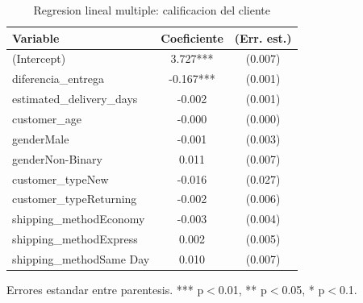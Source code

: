 \begin{table}[htbp]
\centering
\caption{Regresion lineal multiple: calificacion del cliente}
\label{tab:ols}
\begin{tabular}{lcc}
\toprule
Variable & Coeficiente & (Err. est.) \\
\midrule
(Intercept) & 3.727*** & (0.007) \\
diferencia\_entrega & -0.167*** & (0.001) \\
estimated\_delivery\_days & -0.002 & (0.001) \\
customer\_age & -0.000 & (0.000) \\
genderMale & -0.001 & (0.003) \\
genderNon-Binary & 0.011 & (0.007) \\
customer\_typeNew & -0.016 & (0.027) \\
customer\_typeReturning & -0.002 & (0.006) \\
shipping\_methodEconomy & -0.003 & (0.004) \\
shipping\_methodExpress & 0.002 & (0.005) \\
shipping\_methodSame Day & 0.010 & (0.007) \\
\bottomrule
\end{tabular}
\begin{minipage}{0.9\textwidth}\footnotesize Errores estandar entre parentesis. *** p$<$0.01, ** p$<$0.05, * p$<$0.1. \end{minipage}
\end{table}
